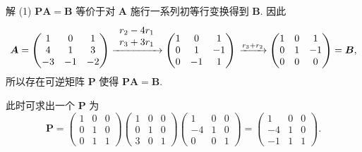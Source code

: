 \documentclass[../../main.tex]{subfiles}
\begin{document}
\begin{solution}
解 (1) $\boldsymbol{PA} = \boldsymbol{B}$ 等价于对 $\boldsymbol{A}$ 施行一系列初等行变换得到 $\boldsymbol{B}$. 因此
\[
\boldsymbol{A} = \begin{pmatrix} 
1 & 0 & 1 \\
4 & 1 & 3 \\
-3 & -1 & -2 
\end{pmatrix} \xrightarrow{\begin{array}{c}
r_2-4r_1\\
r_3+3r_1\\
\end{array}}\begin{pmatrix} 
1 & 0 & 1 \\
0 & 1 & -1 \\
0 & -1 & 1 
\end{pmatrix} \\
\xrightarrow{r_3 + r_2} \begin{pmatrix} 
1 & 0 & 1 \\
0 & 1 & -1 \\
0 & 0 & 0 
\end{pmatrix} = \boldsymbol{B},
\]
所以存在可逆矩阵 $\boldsymbol{P}$ 使得 $\boldsymbol{PA} = \boldsymbol{B}$.

此时可求出一个 $\boldsymbol{P}$ 为
\[
\boldsymbol{P} = \begin{pmatrix} 
1 & 0 & 0 \\
0 & 1 & 0 \\
0 & 1 & 1 
\end{pmatrix} \begin{pmatrix} 
1 & 0 & 0 \\
0 & 1 & 0 \\
3 & 0 & 1 
\end{pmatrix} \begin{pmatrix} 
1 & 0 & 0 \\
-4 & 1 & 0 \\
0 & 0 & 1 
\end{pmatrix} = \begin{pmatrix} 
1 & 0 & 0 \\
-4 & 1 & 0 \\
-1 & 1 & 1 
\end{pmatrix}.
\]


\end{solution}
\end{document}
